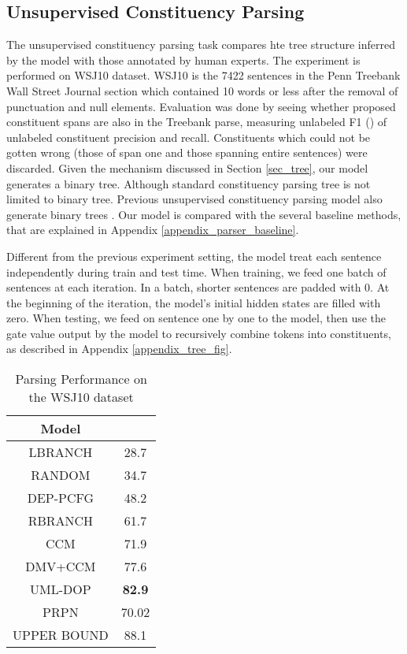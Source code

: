 \documentclass{article} \usepackage{iclr2018_conference,times}
\begin{document}
\subsection{Unsupervised Constituency Parsing}  \label{unsupervised_parsing_exp}
The unsupervised constituency parsing task compares hte tree structure inferred by the model with those annotated by human experts. The experiment is performed on WSJ10 dataset. WSJ10 is the 7422 sentences in the Penn Treebank Wall Street Journal section which contained 10 words or less after the removal of punctuation and null elements. Evaluation was done by seeing whether proposed constituent spans are also in the Treebank parse, measuring unlabeled F1 () of unlabeled constituent precision and recall. Constituents which could not be gotten wrong (those of span one and those spanning entire sentences) were discarded. Given the mechanism discussed in Section \ref{sec_tree}, our model generates a binary tree.
Although standard constituency parsing tree is not limited to binary tree. Previous unsupervised constituency parsing model also generate binary trees \citep{klein2002generative,bod2006all}. Our model is compared with the several baseline methods, that are explained in Appendix \ref{appendix_parser_baseline}.

Different from the previous experiment setting, the model treat each sentence independently during train and test time. When training, we feed one batch of sentences at each iteration. In a batch, shorter sentences are padded with 0. At the beginning of the iteration, the model's initial hidden states are filled with zero. When testing, we feed on sentence one by one to the model, then use the gate value output by the model to recursively combine tokens into constituents, as described in Appendix \ref{appendix_tree_fig}. 

\begin{table}[h]  
\centering  
  \begin{tabular}{ c c }
    \toprule[2pt]
    Model &  \\
    \hline
    LBRANCH &  28.7 \\
    RANDOM & 34.7 \\
    DEP-PCFG \citep{carroll1992two} & 48.2 \\
    RBRANCH & 61.7 \\
    CCM \citep{klein2002generative} & 71.9 \\
    DMV+CCM \citep{klein2005natural} & 77.6 \\
    UML-DOP \citep{bod2006all} & \textbf{82.9} \\
    \hline
    PRPN & 70.02 \\
    \hline
    UPPER BOUND & 88.1 \\
    \toprule[2pt]
  \end{tabular}
  \caption{Parsing Performance on the WSJ10 dataset}
  \label{tb_parser}
\end{table}
\end{document}
